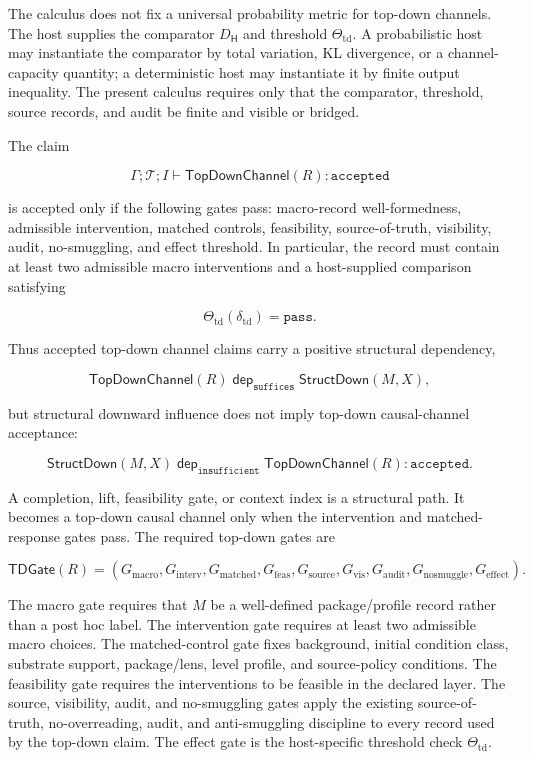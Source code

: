 \documentclass[11pt]{article}
\theoremstyle{definition}
\begin{document}
The calculus does not fix a universal probability metric for top-down channels. The host supplies the comparator \(D_{\mathsf H}\) and threshold \(\Theta_{\mathrm{td}}\). A probabilistic host may instantiate the comparator by total variation, KL divergence, or a channel-capacity quantity; a deterministic host may instantiate it by finite output inequality. The present calculus requires only that the comparator, threshold, source records, and audit be finite and visible or bridged.

The claim

\[
\Gamma;\mathcal T;I
\vdash
\mathsf{TopDownChannel}(R):\texttt{accepted}
\]

is accepted only if the following gates pass: macro-record well-formedness, admissible intervention, matched controls, feasibility, source-of-truth, visibility, audit, no-smuggling, and effect threshold. In particular, the record must contain at least two admissible macro interventions and a host-supplied comparison satisfying

\[
\Theta_{\mathrm{td}}(\delta_{\mathrm{td}})=\texttt{pass}.
\]

Thus accepted top-down channel claims carry a positive structural dependency,

\[
\mathsf{TopDownChannel}(R)
\;\mathrel{\mathsf{dep}_{\texttt{suffices}}}\;
\mathsf{StructDown}(M,X),
\]

but structural downward influence does not imply top-down causal-channel acceptance:

\[
\mathsf{StructDown}(M,X)
\;\mathrel{\mathsf{dep}_{\texttt{insufficient}}}\;
\mathsf{TopDownChannel}(R):\texttt{accepted}.
\]

A completion, lift, feasibility gate, or context index is a structural path. It becomes a top-down causal channel only when the intervention and matched-response gates pass. The required top-down gates are

\[
\mathsf{TDGate}(R)
=
(G_{\mathrm{macro}},G_{\mathrm{interv}},G_{\mathrm{matched}},G_{\mathrm{feas}},
G_{\mathrm{source}},G_{\mathrm{vis}},G_{\mathrm{audit}},G_{\mathrm{nosmuggle}},
G_{\mathrm{effect}}).
\]

The macro gate requires that \(M\) be a well-defined package/profile record rather than a post hoc label. The intervention gate requires at least two admissible macro choices. The matched-control gate fixes background, initial condition class, substrate support, package/lens, level profile, and source-policy conditions. The feasibility gate requires the interventions to be feasible in the declared layer. The source, visibility, audit, and no-smuggling gates apply the existing source-of-truth, no-overreading, audit, and anti-smuggling discipline to every record used by the top-down claim. The effect gate is the host-specific threshold check \(\Theta_{\mathrm{td}}\).
\end{document}
